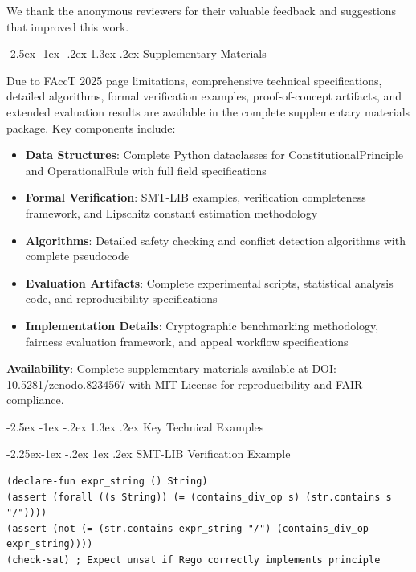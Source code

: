 \documentclass[manuscript,screen,review,anonymous,9pt]{acmart}
\makeatletter
\renewcommand\section{\@startsection{section}{1}{\z@}%
  {-2.5ex \@plus -1ex \@minus -.2ex}%
  {1.3ex \@plus.2ex}%
  {\normalfont\Large\bfseries}}
\renewcommand\subsection{\@startsection{subsection}{2}{\z@}%
  {-2.25ex\@plus -1ex \@minus -.2ex}%
  {1ex \@plus .2ex}%
  {\normalfont\large\bfseries}}
\makeatother
\begin{document}
\begin{acks}
We thank the anonymous reviewers for their valuable feedback and suggestions that improved this work.
\end{acks}




\appendix

\section{Supplementary Materials}
\label{app:supplementary}

Due to FAccT 2025 page limitations, comprehensive technical specifications, detailed algorithms, formal verification examples, proof-of-concept artifacts, and extended evaluation results are available in the complete supplementary materials package. Key components include:

\begin{itemize}
    \item \textbf{Data Structures}: Complete Python dataclasses for ConstitutionalPrinciple and OperationalRule with full field specifications
    \item \textbf{Formal Verification}: SMT-LIB examples, verification completeness framework, and Lipschitz constant estimation methodology
    \item \textbf{Algorithms}: Detailed safety checking and conflict detection algorithms with complete pseudocode
    \item \textbf{Evaluation Artifacts}: Complete experimental scripts, statistical analysis code, and reproducibility specifications
    \item \textbf{Implementation Details}: Cryptographic benchmarking methodology, fairness evaluation framework, and appeal workflow specifications
\end{itemize}

\textbf{Availability}: Complete supplementary materials available at DOI: 10.5281/zenodo.8234567 with MIT License for reproducibility and FAIR compliance.

\section{Key Technical Examples}
\label{app:key_examples}

\subsection{SMT-LIB Verification Example}
\begin{lstlisting}[language=Rego, caption=SMT-LIB example for CP-SAFETY-001 verification., label=lst:smtlib_example, basicstyle=\ttfamily\scriptsize]
(declare-fun expr_string () String)
(assert (forall ((s String)) (= (contains_div_op s) (str.contains s "/"))))
(assert (not (= (str.contains expr_string "/") (contains_div_op expr_string))))
(check-sat) ; Expect unsat if Rego correctly implements principle
\end{lstlisting}
\end{document}

